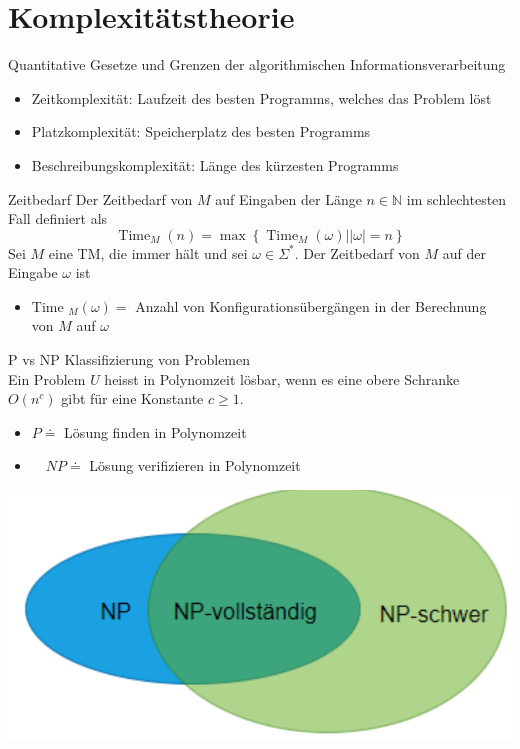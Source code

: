 \graphicspath{{images/}}

\section*{Komplexitätstheorie}

\begin{definition}{Quantitative Gesetze und Grenzen}
    der algorithmischen Informationsverarbeitung

    \begin{itemize}
    \item Zeitkomplexität: Laufzeit des besten Programms, welches das Problem löst
    \item Platzkomplexität: Speicherplatz des besten Programms
    \item Beschreibungskomplexität: Länge des kürzesten Programms
    \end{itemize}
\end{definition}

\begin{theorem}{Zeitbedarf}
    Der Zeitbedarf von $M$ auf Eingaben der Länge $n \in \mathbb{N}$ im schlechtesten Fall definiert als
    $$
    \operatorname{Time}_{M}(n)=\max \left\{\operatorname{Time}_{M}(\omega)|| \omega \mid=n\right\}
    $$
    Sei $M$ eine TM, die immer hält und sei $\omega \in \Sigma^{*}$. Der Zeitbedarf von $M$ auf der Eingabe $\omega$ ist
    \begin{itemize}
    \item Time $_{M}(\omega)=$ Anzahl von Konfigurationsübergängen in der Berechnung von $M$ auf $\omega$
    \end{itemize}
\end{theorem}

\begin{KR}{P vs NP}
    Klassifizierung von Problemen\\
    Ein Problem $U$ heisst in Polynomzeit lösbar, wenn es eine obere Schranke $O\left(n^{c}\right)$ gibt für eine Konstante $c \geq 1$.
    \begin{itemize}
    \item $P \doteq $ Lösung finden in Polynomzeit
    \item $\quad N P \doteq $ Lösung verifizieren in Polynomzeit
    \end{itemize}
    \includegraphics[width=0.5\linewidth]{images/p_vs_np.png}
\end{KR}

